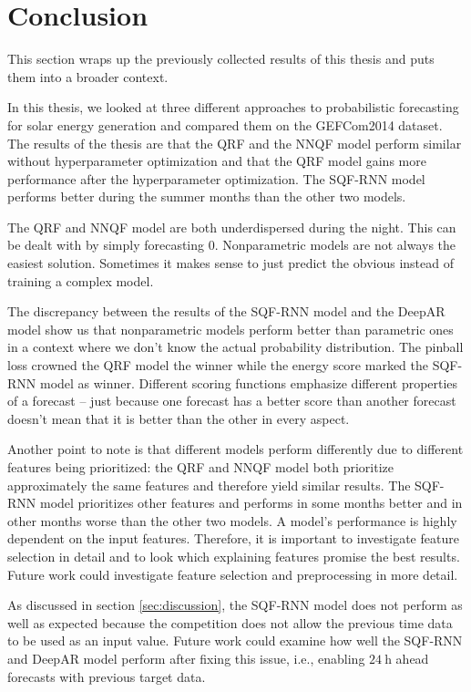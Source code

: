 \section{Conclusion}
\label{sec:conclusion}

This section wraps up the previously collected results of this thesis and 
puts them into a broader context. 

In this thesis, we looked at three different approaches to probabilistic forecasting 
for solar energy generation and compared them on the GEFCom2014 dataset. 
The results of the thesis are that the QRF and the NNQF model perform similar without 
hyperparameter optimization and that the QRF model gains more performance after the hyperparameter 
optimization. The SQF-RNN model performs better during the summer months than the other two models. 

The QRF and NNQF model are both underdispersed during the night. This can be dealt with by simply forecasting \(0\). 
Nonparametric models are not always the easiest solution. Sometimes it makes sense to just predict the obvious 
instead of training a complex model.

The discrepancy between the results of the SQF-RNN model and the DeepAR model show us that 
nonparametric models perform better than parametric ones in a context where we don't know the actual probability distribution. 
The pinball loss crowned the QRF model the winner while the energy score marked the SQF-RNN model as winner. 
Different scoring functions emphasize different properties of a forecast -- just because one forecast has a 
better score than another forecast doesn't mean that it is better than the other in every aspect.

Another point to note is that different models perform differently due to different features being 
prioritized: the QRF and NNQF model both prioritize approximately the same features and therefore 
yield similar results. The SQF-RNN model prioritizes other features and performs in some months better 
and in other months worse than the other two models. A model's performance is highly dependent on the input features.
Therefore, it is important to investigate feature selection in detail and to look which explaining features promise the best results. 
Future work could investigate feature selection and preprocessing in more detail. 

As discussed in section \ref{sec:discussion}, the SQF-RNN model does not perform as well as expected 
because the competition does not allow the previous time data to be used as an input value. 
Future work could examine how well the SQF-RNN and DeepAR model perform after fixing this issue, 
i.e., enabling \(\SI{24}{\hour}\) ahead forecasts with previous target data. 